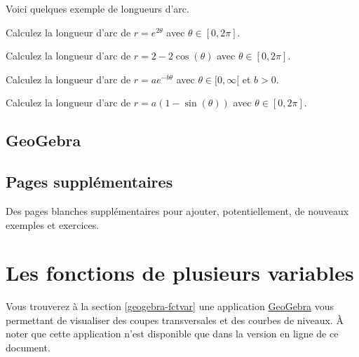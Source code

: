 \documentclass[]{book}
\theoremstyle{definition}
\theoremstyle{definition}
\theoremstyle{definition}
\theoremstyle{remark}
\let\BeginKnitrBlock\begin \let\EndKnitrBlock\end
\begin{document}
Voici quelques exemple de longueurs d'arc.

\BeginKnitrBlock{example}
\protect\hypertarget{exm:unnamed-chunk-114}{}{\label{exm:unnamed-chunk-114}
}Calculez la longueur d'arc de \(r=e^{2\theta}\) avec
\(\theta\in[0,2\pi]\).
\EndKnitrBlock{example}
\vspace*{8cm}

\BeginKnitrBlock{example}
\protect\hypertarget{exm:unnamed-chunk-115}{}{\label{exm:unnamed-chunk-115}
}Calculez la longueur d'arc de \(r=2-2\cos(\theta)\) avec
\(\theta\in[0,2\pi]\).
\EndKnitrBlock{example}
\vspace*{8cm}

\BeginKnitrBlock{example}
\protect\hypertarget{exm:unnamed-chunk-116}{}{\label{exm:unnamed-chunk-116}
}Calculez la longueur d'arc de \(r=ae^{-b\theta}\) avec
\(\theta\in[0,\infty[\) et \(b>0\).
\EndKnitrBlock{example}
\vspace*{10cm}

\BeginKnitrBlock{example}
\protect\hypertarget{exm:unnamed-chunk-117}{}{\label{exm:unnamed-chunk-117}
}Calculez la longueur d'arc de \(r=a(1-\sin(\theta))\) avec
\(\theta\in[0,2\pi]\).
\EndKnitrBlock{example}
\vspace*{8cm}

\hypertarget{geogebra-polaire}{%
\section{GeoGebra}\label{geogebra-polaire}}

\hypertarget{applet_container}{}

\newpage

\hypertarget{pages-supplementaires-2}{%
\section{Pages supplémentaires}\label{pages-supplementaires-2}}

Des pages blanches supplémentaires pour ajouter, potentiellement, de
nouveaux exemples et exercices.


\hypertarget{fctvar}{%
\chapter{Les fonctions de plusieurs variables}\label{fctvar}}

Vous trouverez à la section \ref{geogebra-fctvar} une application
\href{https://www.geogebra.org/?lang=fr}{GeoGebra} vous permettant de
visualiser des coupes transversales et des courbes de niveaux. À noter
que cette application n'est disponible que dans la version en ligne de
ce document.
\end{document}
